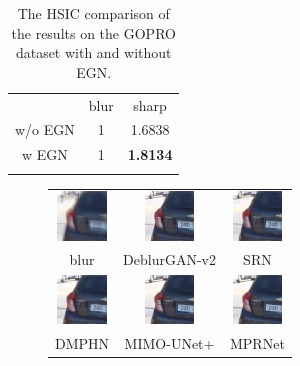 \begin{sloppypar}
\begin{table}[!t]
\renewcommand{\arraystretch}{1.3}
\caption{The HSIC comparison of the results on the GOPRO dataset with and without EGN.}
\label{table5}
\centering
\begin{tabular}{ccc}
\hline\noalign{\smallskip}
 & blur & sharp  \\
\noalign{\smallskip}\hline\noalign{\smallskip}
w/o EGN & 1 & 1.6838 \\
w EGN & 1 & \bf{1.8134} \\
\noalign{\smallskip}\hline
\end{tabular}
\end{table}


\begin{figure}
        \center
        \scriptsize
        \begin{tabular}{ccc}
                \includegraphics[width=1.3cm,height=1.3cm]{./gopro2/GOPR0854_11_00_000005_2_1.png} &    \includegraphics[width=1.3cm,height=1.3cm]{./gopro2/GOPR0854_11_00_000005_D-GAN2_2_1.png} &    
                \includegraphics[width=1.3cm,height=1.3cm]{./gopro2/GOPR0854_11_00_000005_SRN_2_1.png}       \\
                blur & DeblurGAN-v2 & SRN \\
                
                \includegraphics[width=1.3cm,height=1.3cm]{./gopro2/GOPR0854_11_00_000005_DMPHN_2_1.png} &    
                \includegraphics[width=1.3cm,height=1.3cm]{./gopro2/GOPR0854_11_00_000005_MIMO_2_1.png} &    
                \includegraphics[width=1.3cm,height=1.3cm]{./gopro2/GOPR0854_11_00_000005_MPR_2_1.png}       \\
                DMPHN & MIMO-UNet+ & MPRNet \\
                


\end{tabular}
\end{figure}
\end{sloppypar}
